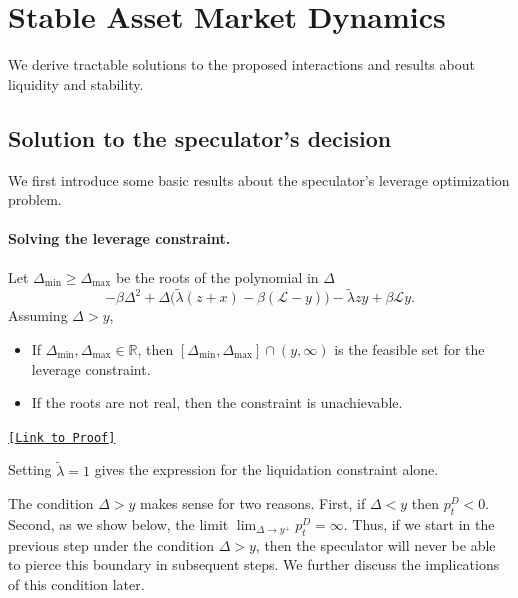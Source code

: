 \section{Stable Asset Market Dynamics}\label{sec:dynamics}

We derive tractable solutions to the proposed interactions and results about liquidity and stability.




\subsection{Solution to the speculator's decision}

We first introduce some basic results about the speculator's leverage optimization problem.

\paragraph{Solving the leverage constraint.}
\begin{proposition}\label{prop:constraint_sol}
	Let $\Delta_{\min} \geq \Delta_{\max}$ be the roots of the polynomial in $\Delta$
	$$-\beta \Delta^2 + \Delta\Big( \tilde \lambda (z+x) - \beta(\mathcal{L} - y)\Big) - \tilde\lambda zy + \beta\mathcal{L} y.$$
	Assuming $\Delta > y$,
	\begin{itemize}
		\item If $\Delta_{\min},\Delta_{\max} \in \mathbb{R}$, then $[\Delta_{\min},\Delta_{\max}]\cap(y,\infty)$ is the feasible set for the leverage constraint.
		\item If the roots are not real, then the constraint is unachievable.
	\end{itemize}
\end{proposition}

\begin{center} \hyperlink{pf:constraint_sol}{\texttt{[Link to Proof]}} \end{center}

Setting $\tilde \lambda = 1$ gives the expression for the liquidation constraint alone.

The condition $\Delta > y$ makes sense for two reasons. First, if $\Delta < y$ then $p^D_t < 0$. Second, as we show below, the limit $\lim_{\Delta \rightarrow y^+} p^D_t = \infty$. Thus, if we start in the previous step under the condition $\Delta > y$, then the speculator will never be able to pierce this boundary in subsequent steps. We further discuss the implications of this condition later.


